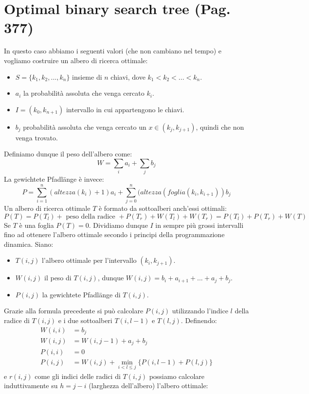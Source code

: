 \documentclass[a4paper]{book}
\begin{document}
\section{Optimal binary search tree (Pag. 377)}
In questo caso abbiamo i seguenti valori (che non cambiano nel tempo) e vogliamo costruire un albero di ricerca ottimale:
\begin{itemize}
\item $S=\{k_1,k_2, ..., k_n \}$ insieme di $n$ chiavi, dove $k_1<k_2<...<k_n$.
\item $a_i$ la probabilità assoluta che venga cercato $k_i$.
\item $I=(k_0,k_{n+1})$ intervallo in cui appartengono le chiavi.
\item $b_j$ probabilità assoluta che venga cercato un $x \in (k_j, k_{j+1})$, quindi che non venga trovato.
\end{itemize}
Definiamo dunque il peso dell'albero come:
$$W=\sum_i a_i + \sum_j b_j$$
La gewichtete Pfadlänge è invece:
$$ P= \sum_{i=1}^n (altezza(k_i)+1)a_i+\sum_{j=0}^n (altezza(foglia(k_i,k_{i+1}))b_j$$
Un albero di ricerca ottimale $T$ è formato da sottoalberi anch'essi ottimali: 
$$ P(T)= P(T_l)+\mbox{ peso della radice }+P(T_r)+W(T_l)+W(T_r)=P(T_l)+P(T_r)+W(T)$$
Se $T$ è una foglia $P(T)=0$. Dividiamo dunque $I$ in sempre più grossi intervalli fino ad ottenere l'albero ottimale secondo i principi della programmazione dinamica. Siano:
\begin{itemize}
\item $T(i,j)$ l'albero ottimale per l'intervallo $(k_i,k_{j+1})$.
\item $W(i,j)$ il peso di $T(i,j)$, dunque $W(i,j)=b_i+a_{i+1}+...+a_j+b_j$.
\item $P(i,j)$ la gewichtete Pfadlänge di $T(i,j)$.
\end{itemize}
Grazie alla formula precedente si può calcolare $P(i,j)$ utilizzando l'indice $l$ della radice di $T(i,j)$ e i due sottoalberi $T(i,l-1)$ e $T(l,j)$. Definendo:
\begin{align*}
W(i,i)&=b_j\\
W(i,j)&=W(i,j-1)+a_j+b_j\\
P(i,i)&=0\\
P(i,j)&=W(i,j)+\min_{i<l\leq j} \{P(i,l-1)+P(l,j)\}
\end{align*}
e $r(i,j)$ come gli indici delle radici di $T(i,j)$ possiamo calcolare induttivamente su $h=j-i$ (larghezza dell'albero) l'albero ottimale:
\end{document}
